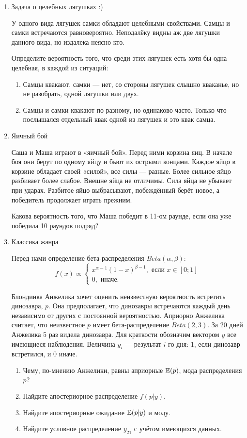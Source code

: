 \begin{enumerate}
\item Задача о целебных лягушках :)

У одного вида лягушек самки обладают целебными свойствами. Самцы и самки
встречаются равновероятно. Неподалёку видны аж две лягушки данного вида, но
издалека неясно кто.

Определите вероятность того, что среди этих лягушек есть хотя бы одна целебная,
в каждой из ситуаций:
\begin{enumerate}
\item Самцы квакают, самки — нет, со стороны лягушек слышно кваканье, но не разобрать,
одной лягушки или двух.
\item Самцы и самки квакают по разному, но одинаково часто. Только что послышался
отдельный квак одной из лягушек и это квак самца.
\end{enumerate}

\item Яичный бой

Саша и Маша играют в «яичный бой». Перед ними корзина яиц. В начале боя они берут
по одному яйцу и бьют их острыми концами. Каждое яйцо в корзине обладает своей «силой»,
все силы — разные. Более сильное яйцо разбивает более слабое. Внешне яйца не отличимы.
Сила яйца не убывает при ударах. Разбитое яйцо выбрасывают, побеждённый берёт новое,
а победитель продолжает играть прежним.

Какова вероятность того, что Маша победит в 11-ом раунде, если она уже победила
10 раундов подряд?

\item Классика жанра

Перед нами определение бета-распределения $Beta(\alpha, \beta)$:
\[
f(x) \propto \begin{cases}
x^{\alpha-1}(1-x)^{\beta-1}, \text{ если } x\in[0;1] \\
0, \text{ иначе.}
\end{cases}
\]

Блондинка Анжелика хочет оценить неизвестную вероятность встретить динозавра, $p$.
Она предполагает, что динозавры встречаются каждый день независимо от других с
постоянной вероятностью. Априорно Анжелика считает, что неизвестное $p$ имеет
бета-распределение $Beta(2, 3)$. За 20 дней Анжелика 5 раз видела динозавра.
Для краткости обозначим вектором $y$ все имеющиеся наблюдения. Величина $y_i$ —
результат $i$-го дня: 1, если динозавр встретился, и 0 иначе.
\begin{enumerate}
\item Чему, по-мнению Анжелики, равны априорные $\operatorname{\mathbb{E}}(p)$, мода распределения $p$?
\item Найдите апостериорное распределение $f(p|y)$.
\item Найдите апостериорные ожидание $\operatorname{\mathbb{E}}(p|y)$ и моду.
\item Найдите условное распределение $y_{21}$ с учётом имеющихся данных.
\end{enumerate}


\end{enumerate}
